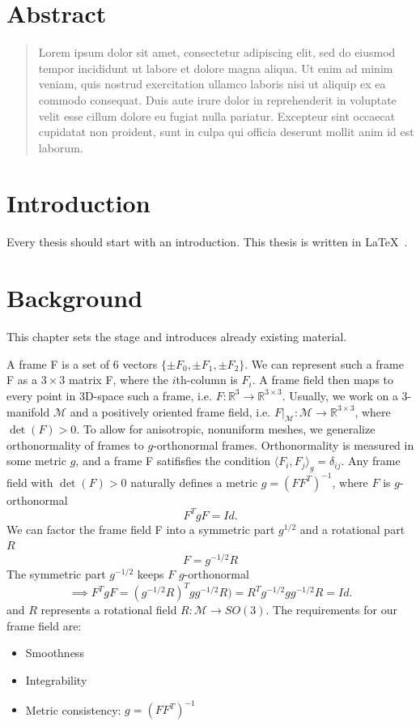 \documentclass[a4paper,twoside,openright,11pt]{report}
\begin{document}
\chapter*{\centering Abstract}
\begin{quote}\noindent
  Lorem ipsum dolor sit amet, consectetur adipiscing elit, sed do eiusmod
  tempor incididunt ut labore et dolore magna aliqua. Ut enim ad minim
  veniam, quis nostrud exercitation ullamco laboris nisi ut aliquip ex ea
  commodo consequat. Duis aute irure dolor in reprehenderit in voluptate
  velit esse cillum dolore eu fugiat nulla pariatur. Excepteur sint
  occaecat cupidatat non proident, sunt in culpa qui officia deserunt
  mollit anim id est laborum.
\end{quote}

\cleardoublepage


\tableofcontents


\cleardoublepage



\chapter{Introduction}
\label{ch:intro}

Every thesis should start with an introduction.  This thesis is written
in \LaTeX~\cite{DBLP:books/daglib/0023602}.

  
\chapter{Background}

This chapter sets the stage and introduces already existing material.

A frame F is a set of 6 vectors $\{\pm F_0, \pm F_1, \pm F_2 \}$.
We can represent such a frame F as a $3\times3$ matrix F, where the $i$th-column is $F_i$.
A frame field then maps to every point in 3D-space such a frame, i.e. $F: \mathbb{R}^3 \to \mathbb{R}^{3\times3}$.
Usually, we work on a 3-manifold $\mathcal{M}$ and a positively oriented frame field, i.e.
$F\vert_{\mathcal{M}}: \mathcal{M} \to \mathbb{R}^{3\times3}$, where $\det(F)>0$.
To allow for anisotropic, nonuniform meshes, we generalize orthonormality of frames to
$g$-orthonormal frames. Orthonormality is measured in some metric $g$, and a frame F satifisfies the condition
$\langle F_i, F_j \rangle _g = \delta_{ij}$.
Any frame field with $\det(F)>0$ naturally defines a metric $g= (FF^T)^{-1}$, where $F$ is $g$-orthonormal
$$F^TgF = Id.$$
We can factor the frame field F into a symmetric part $g^{1/2}$ and a rotational part $R$
$$F = g^{-1/2}R$$
The symmetric part $g^{-1/2}$ keeps $F$ $g$-orthonormal
$$ \implies F^TgF = (g^{-1/2}R)^Tgg^{-1/2}R)=R^Tg^{-1/2}gg^{-1/2}R =Id.$$
and $R$ represents a rotational field $R: \mathcal{M} \to SO(3)$.
The requirements for our frame field are:
\begin{itemize}
  \item Smoothness
  \item Integrability
  \item Metric consistency: $g = (FF^T)^{-1}$
\end{itemize}
\end{document}

